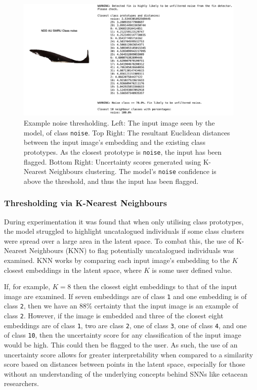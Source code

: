 \begin{figure}[t]
	\begin{center}
		\includegraphics[scale=0.5]{Chapter5/figs/noise-example-ndd-au-smru.png}
	\end{center}
	\caption[Example noise thresholding.]{Example noise thresholding. Left: The input image seen by the model, of class \texttt{noise}. Top Right: The resultant Euclidean distances between the input image's embedding and the existing class prototypes. As the closest prototype is \texttt{noise}, the input has been flagged. Bottom Right: Uncertainty scores generated using K-Nearest Neighbours clustering. The model's \texttt{noise} confidence is above the threshold, and thus the input has been flagged.}
	\label{fig:noise-individual-example-ndd-au-smru}
\end{figure}

\subsubsection{Thresholding via K-Nearest Neighbours}\label{ch:ID,sec:ModelSelection,subsec:UncataloguedIndividualThresholding,subsub:KNN}

 During experimentation it was found that when only utilising class prototypes, the model struggled to highlight uncatalogued individuals if some class clusters were spread over a large area in the latent space. To combat this, the use of K-Nearest Neighbours (KNN) to flag potentially uncatalogued individuals was examined. KNN works by comparing each input image's embedding to the $K$ closest embeddings in the latent space, where $K$ is some user defined value. 
 
 If, for example, $K = 8$ then the closest eight embeddings to that of the input image are examined. If seven embeddings are of class \texttt{1} and one embedding is of class \texttt{2}, then we have an 88\% certainty that the input image is an example of class \texttt{2}. However, if the image is embedded and three of the closest eight embeddings are of class \texttt{1}, two are class \texttt{2}, one of class \texttt{3}, one of class \texttt{4}, and one of class \texttt{10}, then the uncertainty score for any classification of the input image would be high. This could then be flagged to the user. As such, the use of an uncertainty score allows for greater interpretability when compared to a similarity score based on distances between points in the latent space, especially for those without an understanding of the underlying concepts behind SNNs like cetacean researchers. 

